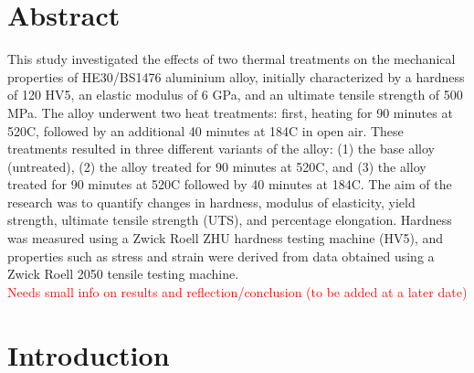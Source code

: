 \documentclass{article}
\begin{document}
    \newpage\vspace*{-20pt}\large

    \section{Abstract}
    \vspace*{1em}
    This study investigated the effects of two thermal treatments on the mechanical properties of HE30/BS1476 aluminium alloy, initially characterized by a hardness of 120 HV5, an elastic modulus of 6 GPa, and an ultimate tensile strength of 500 MPa. The alloy underwent two heat treatments: first, heating for 90 minutes at 520\textdegree C, followed by an additional 40 minutes at 184\textdegree C in open air. These treatments resulted in three different variants of the alloy: (1) the base alloy (untreated), (2) the alloy treated for 90 minutes at 520\textdegree C, and (3) the alloy treated for 90 minutes at 520\textdegree  C followed by 40 minutes at 184\textdegree C. The aim of the research was to quantify changes in hardness, modulus of elasticity, yield strength, ultimate tensile strength (UTS), and percentage elongation. Hardness was measured using a Zwick Roell ZHU hardness testing machine (HV5), and properties such as stress and strain were derived from data obtained using a Zwick Roell 2050 tensile testing machine.\\[1em]
    \textcolor{red}{Needs small info on results and reflection/conclusion (to be added at a later date)}
   
    
    \newpage\vspace*{-20pt}
    \section{Introduction}
\end{document}
